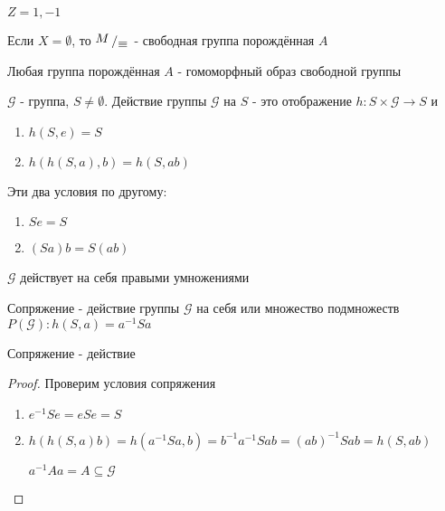 \documentclass[../main/document.tex]{subfiles}
\begin{document}
\begin{exm}
$Z=1,-1$
\end{exm}

\begin{exm}
\end{exm}

\begin{exm}
\end{exm}

\begin{exm}
\end{exm}

\begin{exm}
\end{exm}

\begin{dfn}
Если $X= \emptyset$, то $\bigslant{M}{\equiv}$ - свободная группа порождённая $A$
\end{dfn}

\begin{cnsq}
Любая группа порождённая $A$ - гомоморфный образ свободной группы
\end{cnsq}

\begin{dfn}
$\mathcal{G}$ - группа, $S\neq \emptyset$. Действие группы $\mathcal{G}$ на $S$ - это отображение $h:S\times \mathcal{G}\rightarrow S$ и
\begin{enumerate}
\item $h(S,e)=S$
\item $h(h(S,a),b)=h(S,ab)$
\end{enumerate}
Эти два условия по другому:
\begin{enumerate}
\item $Se=S$
\item $(Sa)b=S(ab)$
\end{enumerate}
\end{dfn}

\begin{exm}
$\mathcal{G}$ действует на себя правыми умножениями
\end{exm}

\begin{dfn}
Сопряжение - действие группы $\mathcal{G}$ на себя или множество подмножеств $P(\mathcal{G}):h(S,a)=a^{-1}Sa$
\end{dfn}

\begin{thm}
Сопряжение - действие
\begin{proof}
Проверим условия сопряжения
\begin{enumerate}
\item $e^{-1}Se=eSe=S$
\item $h(h(S,a)b)=h(a^{-1}Sa,b)=b^{-1}a^{-1}Sab=(ab)^{-1}Sab=h(S,ab)$

$a^{-1}Aa=A\subseteq \mathcal{G}$
\end{enumerate}
\end{proof}
\end{thm}
\end{document}

